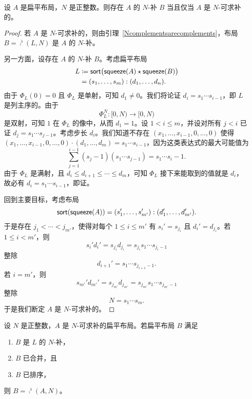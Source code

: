\begin{proposition}\label{characterizationofexistenceofNcomplements}
    设 $A$ 是扁平布局，$N$ 是正整数。则存在 $A$ 的 $N$-补 $B$ 当且仅当 $A$ 是 $N$-可求补的。
\end{proposition}

\begin{proof}
    若 $A$ 是 $N$-可求补的，则由引理~\ref{Ncomplementsarecomplements}，布局 $B = \comp^\flat(L,N)$
    是 $A$ 的 $N$-补。

    另一方面，设存在 $A$ 的 $N$-补 $B$。考虑扁平布局
    \begin{align*} L & \coloneq \mathsf{sort}\bigl(\mathsf{squeeze}(A)\star \mathsf{squeeze}(B)\bigr) \\
    & = (s_1,\dots,s_m):(d_1,\dots,d_n).
    \end{align*}
    由于 $\Phi_L(0) = 0$ 且 $\Phi_L$ 是单射，可知 $d_1 \neq 0$。我们将论证 $d_i = s_1 \cdots s_{i-1}$，即 $L$ 是列主序的。由于
    \[\Phi_L^{N} : [0,N) \to [0,N)\]
    是双射，可知 $1$ 在 $\Phi_L$ 的像中，从而 $d_1 = 1$。设 $1 < i \leq m$，并设对所有 $j < i$ 已证 $d_j = s_1 \cdots s_{j-1}$。考虑步长 $d_{i}$。我们知道不存在 $(x_1,\dots,x_{i-1},0,\dots,0)$ 使得 $(x_1,\dots,x_{i-1},0,\dots,0) \cdot (d_1,\dots,d_m) = s_1\cdots s_{i-1}$，因为这类表达式的最大可能值为
    \[
    \sum_{j = 1}^{i-1} (s_j-1)(s_1\cdots s_{j-1}) = s_1 \cdots s_i - 1.
    \]
    由于 $\Phi_L$ 是满射，且 $d_i \leq  d_{i+1} \leq  \cdots \leq  d_m$，可知 $\Phi_L$ 接下来能取到的值就是 $d_i$，故必有 $d_i = s_1\cdots s_{i-1}$，即证。

    回到主要目标，考虑布局
    \[\mathsf{sort}(\mathsf{squeeze}(A)) = (s_1',\dots,s_{m'}'):(d_1',\dots,d_{m'}').\] 于是存在 $j_1 < \cdots < j_{m'}$，使得对每个 $1 \leq i \leq m'$ 有 $s_i' = s_{j_i}$ 且 $d_i' = d_{j_i}$。若 $1 \leq i < m'$，则
    \[
    s_i'd_i' = s_{j_i}d_{j_i} = s_{j_i} s_1 \cdots s_{j_i - 1}
    \]
    整除
    \[
    d_{i+1}' = s_1 \cdots s_{j_{i+1}-1}.
    \]
    若 $i = m'$，则
    \[
    s_{m'}'d_{m'}' = s_{j_{m'}}d_{j_{m'}} = s_{j_{m'}} s_1 \cdots s_{j_{m'} - 1}
    \]
    整除
    \[
    N = s_1 \cdots s_m.
    \]
    于是我们断定 $A$ 是 $N$-可求补的。
\end{proof}


\begin{proposition}\label{characterizationofflatNcomplement}
    设 $N$ 是正整数，$A$ 是 $N$-可求补的扁平布局。若扁平布局 $B$ 满足
    \begin{enumerate}
        \item $B$ 是 $L$ 的 $N$-补，
        \item $B$ 已合并，且
        \item $B$ 已排序，
    \end{enumerate}
    则 $B = \comp^\flat(A,N)$。
\end{proposition}

